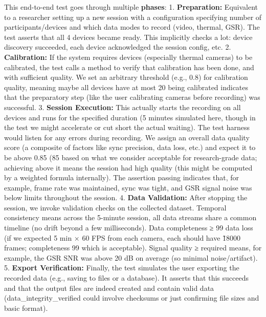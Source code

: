 This end-to-end test goes through multiple \textbf{phases}: 1.
\textbf{Preparation:} Equivalent to a researcher setting up a new session
with a configuration specifying number of participants/devices and which
data modes to record (video, thermal, GSR). The test asserts that all 4
devices became ready. This implicitly checks a lot: device discovery
succeeded, each device acknowledged the session config, etc. 2.
\textbf{Calibration:} If the system requires devices (especially thermal
cameras) to be calibrated, the test calls a method to verify that
calibration has been done, and with sufficient quality. We set an
arbitrary threshold (e.g., 0.8) for calibration quality, meaning maybe
all devices have at most 20%
being calibrated indicates that the preparatory step (like the user
calibrating cameras before recording) was successful. 3. \textbf{Session
Execution:} This actually starts the recording on all devices and runs
for the specified duration (5 minutes simulated here, though in the test
we might accelerate or cut short the actual waiting). The test harness
would listen for any errors during recording. We assign an overall data
quality score (a composite of factors like sync precision, data loss,
etc.) and expect it to be above 0.85 (85%
based on what we consider acceptable for research-grade data; achieving
above it means the session had high quality (this might be computed by a
weighted formula internally). The assertion passing indicates that, for
example, frame rate was maintained, sync was tight, and GSR signal noise
was below limits throughout the session. 4. \textbf{Data Validation:} After
stopping the session, we invoke validation checks on the collected
dataset. Temporal consistency means across the 5-minute session, all
data streams share a common timeline (no drift beyond a few
milliseconds). Data completeness ≥ 99%
data loss (if we expected 5 min × 60 FPS from each camera, each should
have \~18000 frames; completeness 99%
which is acceptable). Signal quality ≥ required means, for example, the
GSR SNR was above 20 dB on average (so minimal noise/artifact). 5.
\textbf{Export Verification:} Finally, the test simulates the user exporting
the recorded data (e.g., saving to files or a database). It asserts that
this succeeds and that the output files are indeed created and contain
valid data (data_integrity_verified could involve checksums or just
confirming file sizes and basic format).

